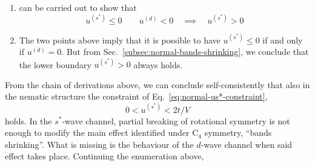 \begin{enumerate}
	From Eq.~\eqref{eq:BZ-B-def}, $\forall \mathbf{k} \in \mathcal{B}$ the form factor $\cos k_x + \cos k_y$ is positive by construction; the form factor $\cos k_x - \cos k_y$ is negative by construction. By hypothesis $\epsilon^{(s^*)} < 0$ and $\epsilon^{(d)} > 0$. Hence:
	\[
	\forall \mathbf{k} \in \mathcal{B}
	\quad\colon\quad
	\begin{aligned}
		\tilde{\epsilon}_\mathbf{k} &= \overbrace{\epsilon^{(s^*)} \left( \cos k_x + \cos k_y \right)}^{\le 0} + \overbrace{\epsilon^{(d)}  \left( \cos k_x - \cos k_y \right) }^{\le 0} \\
		\tilde{\epsilon}_{\mathcal{R}\mathbf{k}} &= \underbrace{\epsilon^{(s^*)} \left( \cos k_x + \cos k_y \right)}_{\le 0} - \underbrace{\epsilon^{(d)}  \left( \cos k_x - \cos k_y \right) }_{\le 0}
	\end{aligned}
	\]
	Summing the two equations above we have:
	\[
	\forall \mathbf{k} \in \mathcal{B}
	\quad\colon\quad
	\tilde{\epsilon}_\mathbf{k} + \tilde{\epsilon}_{\mathcal{R}\mathbf{k}} \le 0
	\]
	thus $\tilde{\epsilon}_\mathbf{k} \le -\tilde{\epsilon}_{\mathcal{R}\mathbf{k}}$.	The Fermi-Dirac distribution is monotonically descendent. Then:
	\[
	\forall \mathbf{k} \in \mathcal{B}
	\quad\colon\quad
	\begin{aligned}
		f(\tilde{\epsilon}_\mathbf{k};\beta,\tilde{\mu}) &\ge f(-\tilde{\epsilon}_{\mathcal{R}\mathbf{k}};\beta,\tilde{\mu}) \\
		f(-\tilde{\epsilon}_\mathbf{k};\beta,\tilde{\mu}) &\le f(\tilde{\epsilon}_{\mathcal{R}\mathbf{k}};\beta,\tilde{\mu}) 
	\end{aligned}
	\]
	This condition, inserted in Eq.~\eqref{eq:normal-us*-AR}, leads to an absurd:
	\[
	u^{(s^*)} \le 0 \qquad
	u^{(d)} > 0
	\quad\implies\quad
	u^{(s^*)} > 0
	\]
	\item can be carried out to show that
	\[
	u^{(s^*)} \le 0
	\qquad
	u^{(d)} < 0
	\quad\implies\quad
	u^{(s^*)} > 0
	\]
	\item The two points above imply that it is possible to have $u^{(s^*)} \le 0$ if and only if $u^{(d)}=0$. But from Sec.~\ref{subsec:normal-bands-shrinking}, we conclude that the lower boundary $u^{(s^*)} > 0$ always holds.
	\setcounter{enumTemp}{\theenumi}
\end{enumerate}
From the chain of derivations above, we can conclude self-consistently that also in the nematic structure the constraint of Eq.~\eqref{eq:normal-us*-constraint},
\[
0 < u^{(s^*)} < 2t/V
\]
holds. In the $s^*$-wave channel, partial breaking of rotational symmetry is not enough to modify the main effect identified under $\mathrm{C}_4$ symmetry, ``bands shrinking''. What is missing is the behaviour of the $d$-wave channel when said effect takes place. Continuing the enumeration above,

